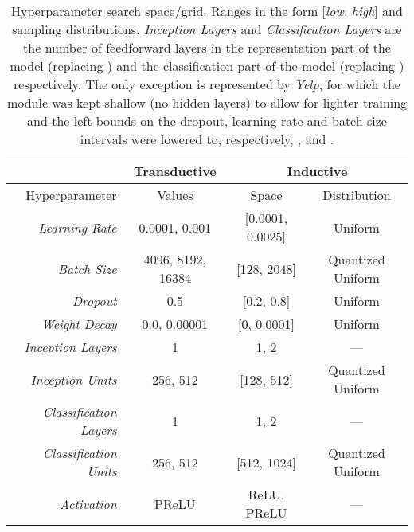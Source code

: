 \documentclass{article}
\begin{document}
\begin{table*}[h!]
    \caption{Hyperparameter search space/grid. Ranges in the form [\textit{low}, \textit{high}] and sampling distributions. \textit{Inception Layers} and \textit{Classification Layers} are the number of feedforward layers in the representation part of the model (replacing ) and the classification part of the model (replacing ) respectively. The only exception is represented by \textit{Yelp}, for which the  module was kept shallow (no hidden layers) to allow for lighter training and the left bounds on the dropout, learning rate and batch size intervals were lowered to, respectively, ,  and .}\label{tab:hyperparameter_search}
    \vskip 0.15in
    \begin{center}
    \begin{small}
    \begin{sc}
    \begin{tabular}{| r | c | cc |}
    \hline
    & \multicolumn{1}{c|}{Transductive} & \multicolumn{2}{c|}{Inductive} \\
    \hline
    Hyperparameter & Values & Space & Distribution \\
    \hline
    \textit{Learning Rate}
        & 0.0001, 0.001 
        & [0.0001, 0.0025]
        & Uniform \\
    \textit{Batch Size}
        & 4096, 8192, 16384
        & [128, 2048]
        & Quantized Uniform \\
    \textit{Dropout}
        & 0.5
        & [0.2, 0.8]
        & Uniform \\ 
    \textit{Weight Decay}
        & 0.0, 0.00001
        & [0, 0.0001]
        & Uniform \\
    \textit{Inception Layers}
        & 1
        & 1, 2
        & ---\\ 
    \textit{Inception Units}
        & 256, 512
        & [128, 512]
        & Quantized Uniform\\ 
    \textit{Classification Layers}
        & 1
        & 1, 2
        & --- \\
    \textit{Classification Units}
        & 256, 512
        & [512, 1024]
        & Quantized Uniform\\ 
    \textit{Activation}
        & PReLU
        & ReLU, PReLU
        & --- \\
    \hline
    \end{tabular}
    \end{sc}
    \end{small}
    \end{center}
    \vskip -0.1in
\end{table*}
\end{document}
